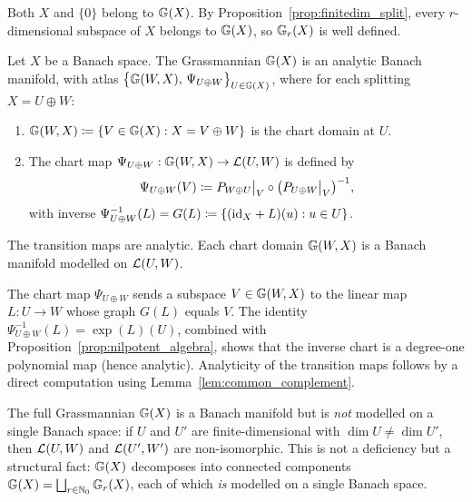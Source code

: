 Both $X$ and $\{0\}$ belong to $\mathbb{G}(X)$.
By Proposition~\ref{prop:finitedim_split}, every $r$-dimensional subspace
of $X$ belongs to $\mathbb{G}(X)$, so $\mathbb{G}_{r}(X)$ is well defined.

\begin{theorem}
\label{thm:grassmann_manifold}
Let $X$ be a Banach space. The Grassmannian $\mathbb{G}(X)$ is an analytic
Banach manifold, with atlas
$\bigl\{\mathbb{G}(W, X),\, \Psi_{U \oplus W}\bigr\}_{U \in \mathbb{G}(X)}$,
where for each splitting $X = U \oplus W$:
\begin{enumerate}
\item[\textup{(i)}] $\mathbb{G}(W, X) \coloneqq
    \{V \in \mathbb{G}(X) : X = V \oplus W\}$
    is the chart domain at $U$.
\item[\textup{(ii)}] The chart map
    $\Psi_{U \oplus W}: \mathbb{G}(W, X) \to \mathcal{L}(U, W)$
    is defined by
    \begin{equation}
    \label{eq:grassmann_chart}
        \Psi_{U \oplus W}(V) \coloneqq
        P_{W \oplus U}\big|_V \circ \bigl(P_{U \oplus W}\big|_V\bigr)^{-1},
    \end{equation}
    with inverse
    $\Psi_{U \oplus W}^{-1}(L) = G(L) \coloneqq
    \{(\mathrm{id}_{X} + L)(u) : u \in U\}$.
\end{enumerate}
The transition maps are analytic. Each chart domain
$\mathbb{G}(W, X)$ is a Banach manifold modelled on $\mathcal{L}(U, W)$.
\end{theorem}

The chart map $\Psi_{U \oplus W}$ sends a subspace $V \in \mathbb{G}(W,X)$
to the linear map $L: U \to W$ whose graph $G(L)$ equals $V$. The
identity $\Psi_{U\oplus W}^{-1}(L) = \exp(L)(U)$, combined with
Proposition~\ref{prop:nilpotent_algebra}, shows that the inverse chart is
a degree-one polynomial map (hence analytic). Analyticity of the
transition maps follows by a direct computation using
Lemma~\ref{lem:common_complement}.

\begin{remark}
\label{rem:grassmann_not_modelled}
The full Grassmannian $\mathbb{G}(X)$ is a Banach manifold but is
\emph{not} modelled on a single Banach space: if $U$ and $U'$ are
finite-dimensional with $\dim U \neq \dim U'$, then $\mathcal{L}(U, W)$ and
$\mathcal{L}(U', W')$ are non-isomorphic. This is not a deficiency but a
structural fact: $\mathbb{G}(X)$ decomposes into connected components
$\mathbb{G}(X) = \bigsqcup_{r \in \mathbb{N}_0} \mathbb{G}_{r}(X)$, each of which
\emph{is} modelled on a single Banach space.
\end{remark}

